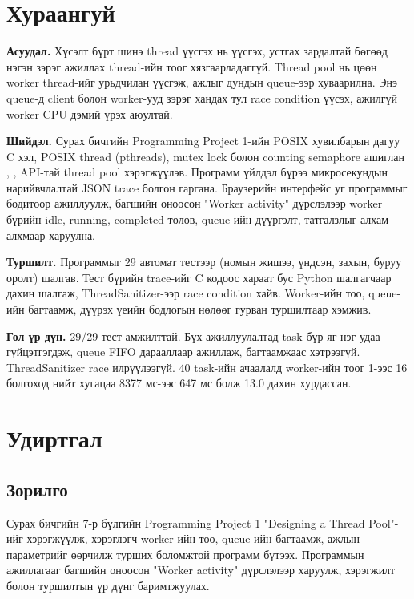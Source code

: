 \documentclass[12pt,a4paper]{article}
\begin{document}

\section*{Хураангуй}

\textbf{Асуудал.} Хүсэлт бүрт шинэ thread үүсгэх нь үүсгэх, устгах зардалтай бөгөөд нэгэн зэрэг ажиллах thread-ийн тоог хязгаарладаггүй. Thread pool нь цөөн worker thread-ийг урьдчилан үүсгэж, ажлыг дундын queue-ээр хуваарилна. Энэ queue-д client болон worker-ууд зэрэг хандах тул race condition үүсэх, ажилгүй worker CPU дэмий үрэх аюултай.

\textbf{Шийдэл.} Сурах бичгийн Programming Project 1-ийн POSIX хувилбарын дагуу C хэл, POSIX thread (pthreads), mutex lock болон counting semaphore ашиглан , ,  API-тай thread pool хэрэгжүүлэв. Программ үйлдэл бүрээ микросекундын нарийвчлалтай JSON trace болгон гаргана. Браузерийн интерфейс уг программыг бодитоор ажиллуулж, багшийн оноосон "Worker activity" дүрслэлээр worker бүрийн idle, running, completed төлөв, queue-ийн дүүргэлт, татгалзлыг алхам алхмаар харуулна.

\textbf{Туршилт.} Программыг 29 автомат тестээр (номын жишээ, үндсэн, захын, буруу оролт) шалгав. Тест бүрийн trace-ийг C кодоос хараат бус Python шалгагчаар дахин шалгаж, ThreadSanitizer-ээр race condition хайв. Worker-ийн тоо, queue-ийн багтаамж, дүүрэх үеийн бодлогын нөлөөг гурван туршилтаар хэмжив.

\textbf{Гол үр дүн.} 29/29 тест амжилттай. Бүх ажиллуулалтад task бүр яг нэг удаа гүйцэтгэгдэж, queue FIFO дарааллаар ажиллаж, багтаамжаас хэтрээгүй. ThreadSanitizer race илрүүлээгүй. 40 task-ийн ачаалалд worker-ийн тоог 1-ээс 16 болгоход нийт хугацаа 8377 мс-ээс 647 мс болж 13.0 дахин хурдассан.

\clearpage

\tableofcontents
\clearpage

\section{Удиртгал}

\subsection{Зорилго}

Сурах бичгийн 7-р бүлгийн Programming Project 1 "Designing a Thread Pool"-ийг хэрэгжүүлж, хэрэглэгч worker-ийн тоо, queue-ийн багтаамж, ажлын параметрийг өөрчилж турших боломжтой программ бүтээх. Программын ажиллагааг багшийн оноосон "Worker activity" дүрслэлээр харуулж, хэрэгжилт болон туршилтын үр дүнг баримтжуулах.
\end{document}
